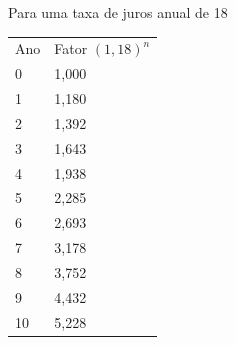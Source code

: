 Para uma taxa de juros anual de 18%
\begin{tabular}{l l}
Ano & Fator $(1{,}18)^{n}$ \\
0 & 1,000 \\
1 & 1,180 \\
2 & 1,392 \\
3 & 1,643 \\
4 & 1,938 \\
5 & 2,285 \\
6 & 2,693 \\
7 & 3,178 \\
8 & 3,752 \\
9 & 4,432 \\
10 & 5,228 \\
\end{tabular}
